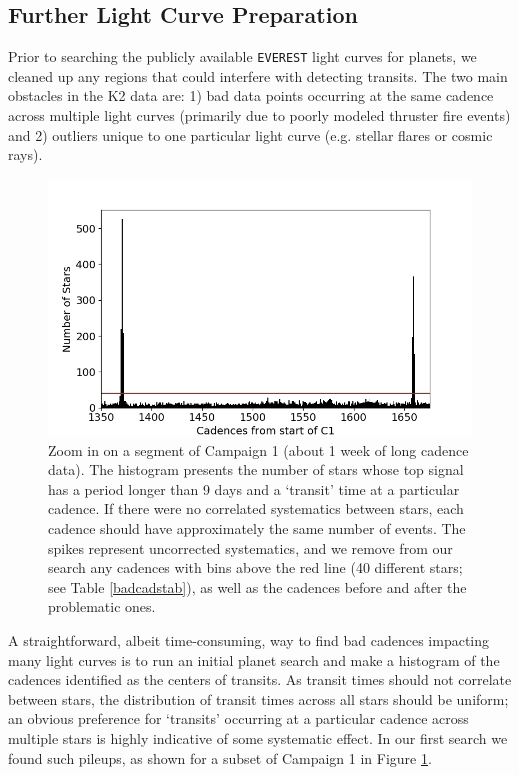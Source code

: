 \documentclass[twocolumn]{aastex62}
\newcommand{\pipeline}[1]{\texttt{#1}}
\begin{document}
\subsection{Further Light Curve Preparation}
\label{prep}

Prior to searching the publicly available \pipeline{EVEREST} light
curves for planets, we cleaned up any regions that could interfere
with detecting transits. The two main obstacles in the K2 data are: 1)
bad data points occurring at the same cadence across multiple light
curves (primarily due to poorly modeled thruster fire events) and 2)
outliers unique to one particular light curve (e.g. stellar flares or
cosmic rays).

\begin{figure}[tbp]
\includegraphics[width=\columnwidth]{bad_cads.png}
\caption{Zoom in on a segment of Campaign 1 (about 1 week of long
  cadence data).  The histogram presents the number of stars whose top
  signal has a period longer than 9 days and a `transit' time at a
  particular cadence. If there were no correlated systematics between
  stars, each cadence should have approximately the same number of
  events. The spikes represent uncorrected systematics, and we remove
  from our search any cadences with bins above the red line (40
  different stars; see Table \ref{badcadstab}), as well as the
  cadences before and after the problematic ones. \label{badcads}}
\end{figure}

A straightforward, albeit time-consuming, way to find bad cadences
impacting many light curves is to run an initial planet search and
make a histogram of the cadences identified as the centers of
transits. As transit times should not correlate between stars, the
distribution of transit times across all stars should be uniform; an
obvious preference for `transits' occurring at a particular cadence
across multiple stars is highly indicative of some systematic
effect. In our first search we found such pileups, as shown for a
subset of Campaign 1 in Figure \ref{badcads}.
\end{document}
